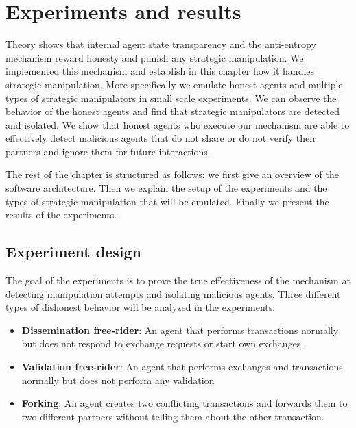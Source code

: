 \chapter{Experiments and results}
Theory shows that internal agent state transparency and the anti-entropy mechanism reward honesty
and punish any strategic manipulation. We implemented this mechanism and establish in this chapter
how it handles strategic manipulation. More specifically we emulate honest agents and multiple 
types of strategic manipulators in small scale experiments. We can observe the behavior of the 
honest agents and find that strategic manipulators are detected and isolated. We show that honest agents who
execute our mechanism are able to effectively detect malicious agents that do not share or do not verify their partners 
and ignore them for future interactions.

The rest of the chapter is structured as follows: we first give an overview of the software 
architecture. Then we explain the setup of the experiments and the types of strategic manipulation
that will be emulated. Finally we present the results of the experiments.


\section{Experiment design}
The goal of the experiments is to prove the true effectiveness of the mechanism at detecting 
manipulation attempts and isolating malicious agents. Three different types of dishonest behavior 
will be analyzed in the experiments.

\begin{itemize}
    \item \textbf{Dissemination free-rider}: An agent that performs transactions normally but does
    not respond to exchange requests or start own exchanges.
    \item \textbf{Validation free-rider}: An agent that performs exchanges and transactions normally
    but does not perform any validation
    \item \textbf{Forking}: An agent creates two conflicting transactions and forwards them to two 
    different partners without telling them about the other transaction.  
\end{itemize}

